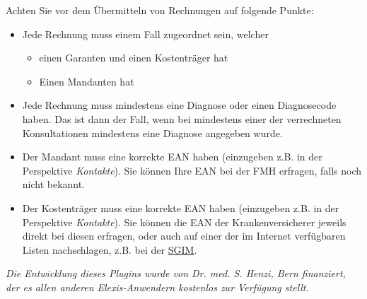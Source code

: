 Achten Sie vor dem Übermitteln von Rechnungen auf folgende Punkte:
\begin{itemize}
 \item Jede Rechnung muss einem Fall zugeordnet sein, welcher
\begin{itemize}
 \item einen Garanten und einen Kostenträger hat
\item Einen Mandanten hat
\end{itemize}
\item Jede Rechnung muss mindestens eine Diagnose oder einen Diagnosecode haben. Das ist dann der Fall, wenn bei mindestens einer der verrechneten Konsultationen mindestens eine Diagnose angegeben wurde.
\item Der Mandant muss eine korrekte EAN haben (einzugeben z.B. in der Perspektive  \textit{Kontakte}). Sie können Ihre EAN bei der FMH erfragen, falls noch nicht bekannt.
\item Der Kostenträger muss eine korrekte EAN haben (einzugeben z.B. in der Perspektive \textit{Kontakte}). Sie können die EAN der Krankenversicherer jeweils direkt bei diesen erfragen, oder auch auf einer der im Internet verfügbaren Listen nachschlagen, z.B. bei der \href{http://www.sgim.ch/info/tarmed/EAN_KV.pdf}{SGIM}.

\end{itemize}

\textit{Die Entwicklung dieses Plugins wurde von Dr. med. S. Henzi,
Bern finanziert, der es allen anderen Elexis-Anwendern
kostenlos zur Verfügung stellt.}


